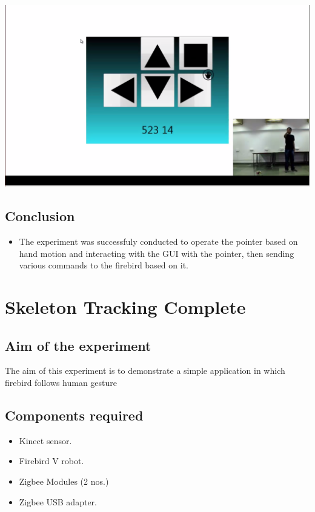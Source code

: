 \begin{flushleft}
\medskip
\includegraphics[scale = 0.5]{e82}

\medskip
\medskip
\subsection{\textbf{ Conclusion}}
\begin{itemize}
\item The experiment was successfuly conducted to operate the pointer based on hand motion and interacting with the GUI with the pointer, then sending various commands to the firebird based on it.
\end{itemize}
\medskip
\newpage


\section{\textbf{ Skeleton Tracking Complete}}
\label{4.9}
\medskip
\subsection{\textbf{ Aim of the experiment}}
The aim of this experiment is to demonstrate a simple application in which firebird follows human gesture
\medskip

\subsection{\textbf{ Components required}}
\begin{itemize}
\item Kinect sensor.
\item Firebird V robot.
\item Zigbee Modules (2 nos.)
\item Zigbee USB adapter.
\end{itemize}
\medskip


\end{flushleft}
